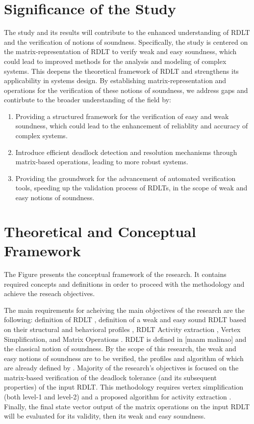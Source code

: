 \section{Significance of the Study}
\indent The study and its results will contribute to the enhanced understanding of RDLT and the verification of notions of soundness. Specifically, the study is centered on the matrix-representation of RDLT to verify weak and easy soundness, which could lead to improved methods for the analysis and modeling of complex systems. This deepens the theoretical framework of RDLT and strengthens its applicability in systems design. By establishing matrix-representation and operations for the verification of these notions of soundness, we address gaps and contirbute to the broader understanding of the field by:
\begin{enumerate}
    \item Providing a structured framework for the verification of easy and weak soundness, which could lead to the enhancement of reliablity and accuracy of complex systems.
    \item Introduce efficient deadlock detection and resolution mechanisms through matrix-based operations, leading to more robust systems.
    \item Providing the groundwork for the advancement of automated verification tools, speeding up the validation process of RDLTs, in the scope of weak and easy notions of soundness.
\end{enumerate}

\section{Theoretical and Conceptual Framework}
The Figure presents the conceptual framework of the research. It contains required concepts and definitions in order to proceed with the methodology and achieve the reseach objectives. 

The main requirements for acheiving the main objectives of the research are the following: definition of RDLT \cite{Malinao2017}, definition of a weak and easy sound RDLT based on their structural and behavioral profiles \cite{Ramirez2024}, RDLT Activity extraction \cite{Malinao2017} \cite{Asoy2024}, Vertex Simplification, and Matrix Operations \cite{KarenRoben2018}. RDLT is defined in [maam malinao] and the classical notion of soundness. By the scope of this research, the weak and easy notions of soundness are to be verified, the profiles and algorithm of which are already defined by \cite{Ramirez2024}. Majority of the research's objectives is focused on the matrix-based verification of the deadlock tolerance (and its subsequent properties) of the input RDLT. This methodology requires vertex simplification \cite{Malinao2017} (both level-1 and level-2) and a proposed algorithm for activity extraction \cite{Malinao2017}. Finally, the final state vector output of the matrix operations on the input RDLT will be evaluated for its validity, then its weak and easy soundness.

